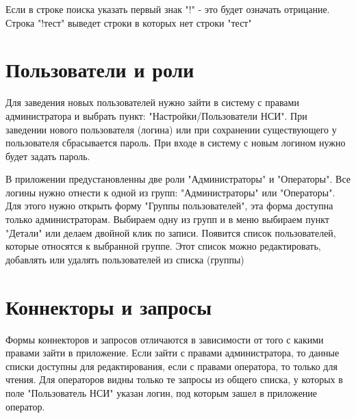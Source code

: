 \documentclass[12pt, a4paper]{article}
\begin{document}
Если в строке поиска указать первый знак "!" - это будет означать отрицание. 
Строка "!тест" выведет строки в которых нет строки "тест"

\section{Пользователи и роли}
Для заведения новых пользователей нужно зайти в систему с правами администратора и выбрать пункт: "Настройки/Пользователи НСИ".
При заведении нового пользователя (логина) или при сохранении существующего у пользователя сбрасывается пароль. 
При входе в систему с новым логином нужно будет задать пароль.

В приложении предустановленны две роли "Администраторы" и "Операторы". 
Все логины нужно отнести к одной из групп: "Администраторы" или "Операторы". 
Для этого нужно открыть форму "Группы пользователей", эта форма доступна только администраторам. 
Выбираем одну из групп и в меню выбираем пункт "Детали" или делаем двойной клик по записи. 
Появится список пользователей, которые относятся к выбранной группе. 
Этот список можно редактировать, добавлять или удалять пользователей из списка (группы)



\section{Коннекторы и запросы} 
Формы коннекторов и запросов отличаются в зависимости от того с какими правами зайти в приложение. 
Если зайти с правами администратора, то данные списки доступны для редактирования, если с правами оператора, 
то только для чтения. Для операторов видны только те запросы из общего списка, у которых в поле "Пользователь НСИ"
указан логин, под которым зашел в приложение оператор.
\end{document}
